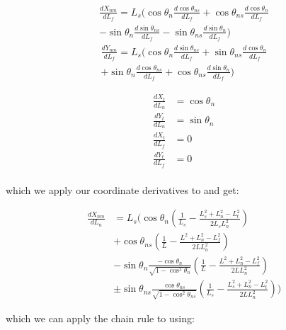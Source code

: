 \documentclass[11pt,twocolumn]{article}
\begin{document}
\begin{multline}
  \frac{dX_{nm}}{dL_f} = L_s\Big(
  \cos\theta_n\frac{d\cos\theta_{ns}}{dL_f}
  + \cos\theta_{ns}\frac{d\cos\theta_{n}}{dL_f} \\
  - \sin\theta_n\frac{d\sin\theta_{ns}}{dL_f}
  - \sin\theta_{ns}\frac{d\sin\theta_{n}}{dL_f}
  \Big)
\end{multline}
\begin{multline}
  \frac{dY_{nm}}{dL_f} = L_s\Big(
  \cos\theta_n\frac{d\sin\theta_{ns}}{dL_f}
  + \sin\theta_{ns}\frac{d\cos\theta_{n}}{dL_f} \\
  + \sin\theta_n\frac{d\cos\theta_{ns}}{dL_f}
  + \cos\theta_{ns}\frac{d\sin\theta_{n}}{dL_f}
  \Big)
\end{multline}

\begin{align}
  \frac{dX_{t}}{dL_n} &= \cos\theta_n\\
  \frac{dY_{t}}{dL_n} &= \sin\theta_n\\
  \frac{dX_{t}}{dL_f} &= 0\\
  \frac{dY_{t}}{dL_f} &= 0\\
\end{align}

which we apply our coordinate derivatives to and get:

\begin{align}
  \frac{dX_{nm}}{dL_n} &= L_s\Big(
  \cos\theta_n\left(\frac{1}{L_s} - \frac{L_s^2 + L_n^2 - L_t^2}{2L_sL_n^2}\right)\\
  &+ \cos\theta_{ns}\left(\frac{1}{L} - \frac{L^2 + L_n^2 - L_f^2}{2L L_n^2}\right)\\
  &- \sin\theta_n\frac{-\cos\theta_n}{\sqrt{1-\cos^2\theta_n}}
  \left(\frac{1}{L} - \frac{L^2 + L_n^2 - L_f^2}{2L L_n^2}\right)\\
  &\pm \sin\theta_{ns}
    \frac{\cos\theta_{ns}}{\sqrt{1-\cos^2\theta_{ns}}}
    \left(\frac{1}{L_s} - \frac{L_s^2+L_n^2-L_t^2}{2LL_n^2}\right)
  \Big)
\end{align}

which we can apply the chain rule to using:
\end{document}
